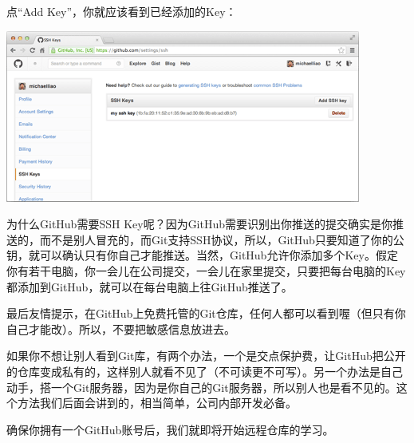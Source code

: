\documentclass[•]{article}
\begin{document}
\begin{CJK}{UTF8}{gbsn}
点“Add Key”，你就应该看到已经添加的Key：

\begin{center}
\includegraphics[scale=0.6]{add_key.png}
\end{center}

\qquad 为什么GitHub需要SSH Key呢？因为GitHub需要识别出你推送的提交确实是你推送的，而不是别人冒充的，而Git支持SSH协议，所以，GitHub只要知道了你的公钥，就可以确认只有你自己才能推送。当然，GitHub允许你添加多个Key。假定你有若干电脑，你一会儿在公司提交，一会儿在家里提交，只要把每台电脑的Key都添加到GitHub，就可以在每台电脑上往GitHub推送了。

\qquad 最后友情提示，在GitHub上免费托管的Git仓库，任何人都可以看到喔（但只有你自己才能改）。所以，不要把敏感信息放进去。

\qquad 如果你不想让别人看到Git库，有两个办法，一个是交点保护费，让GitHub把公开的仓库变成私有的，这样别人就看不见了（不可读更不可写）。另一个办法是自己动手，搭一个Git服务器，因为是你自己的Git服务器，所以别人也是看不见的。这个方法我们后面会讲到的，相当简单，公司内部开发必备。

确保你拥有一个GitHub账号后，我们就即将开始远程仓库的学习。


\end{CJK}
\end{document}
